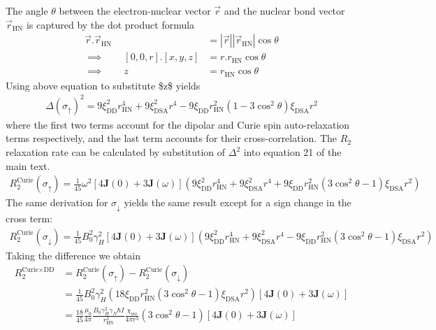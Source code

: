 \documentclass[a4paper,10pt,english,openany,oneside]{sphinxmanual}
\begin{document}
The angle \(\theta\) between the electron-nuclear vector \(\vec r\) and the nuclear bond vector \(\vec r_\text{HN}\) is captured by the dot product formula
\begin{equation*}
\begin{split}\vec r.\vec r_\text{HN} &= |\vec r||\vec r_\text{HN}| \cos{\theta}\\
\implies \qquad [0,0,r].[x,y,z] &= r.r_\text{HN} \cos{\theta}\\
\implies \qquad  z &= r_\text{HN} \cos{\theta}\end{split}
\end{equation*}
Using above equation to substitute \$z\$ yields
\begin{equation*}
\begin{split}\Delta(\sigma_\uparrow)^2= 9\xi_\text{DD}^2r_\text{HN}^4 + 9\xi_\text{DSA}^2r^4 - 9\xi_\text{DD}r_\text{HN}^2(1-3\cos^2{\theta})\xi_\text{DSA}r^2\end{split}
\end{equation*}
where the first two terms account for the dipolar and Curie spin auto-relaxation terms respectively, and the last term accounts for their cross-correlation. The \(R_2\) relaxation rate can be calculated by substitution of \(\Delta^2\) into equation 21 of the main text.
\begin{equation*}
\begin{split}R_2^\text{Curie}(\sigma_\uparrow) = \frac{1}{45}\omega^2 \left[4\mathbf{J}(0) + 3\mathbf{J}(\omega)\right]
\left( 9\xi_\text{DD}^2r_\text{HN}^4 + 9\xi_\text{DSA}^2r^4 +
9\xi_\text{DD}r_\text{HN}^2(3\cos^2{\theta}-1)\xi_\text{DSA}r^2 \right)\end{split}
\end{equation*}
The same derivation for \(\sigma_\downarrow\) yields the same result except for a sign change in the cross term:
\begin{equation*}
\begin{split}R_2^\text{Curie}(\sigma_\downarrow) = \frac{1}{45}B_0^2\gamma_H^2 \left[4\mathbf{J}(0) + 3\mathbf{J}(\omega)\right]
\left( 9\xi_\text{DD}^2r_\text{HN}^4 + 9\xi_\text{DSA}^2r^4 -
9\xi_\text{DD}r_\text{HN}^2(3\cos^2{\theta}-1)\xi_\text{DSA}r^2 \right)\end{split}
\end{equation*}
Taking the difference we obtain
\begin{equation*}
\begin{split}R_2^\text{Curie$\times$DD} &= R_2^\text{Curie}(\sigma_\uparrow) - R_2^\text{Curie}(\sigma_\downarrow)\\
&= \frac{1}{45}B_0^2\gamma_H^2 \left(18\xi_\text{DD}r_\text{HN}^2(3\cos^2{\theta}-1)\xi_\text{DSA}r^2 \right)\left[4\mathbf{J}(0) + 3\mathbf{J}(\omega)\right]\\
&=\frac{18}{45} \frac{\mu_0}{4\pi} \frac{B_0\gamma_H^2\gamma_N\hbar I}{r_\text{HN}^3}\frac{\chi_\text{iso}}{4\pi r^3}(3\cos^2{\theta}-1)\left[4\mathbf{J}(0) + 3\mathbf{J}(\omega)\right]\end{split}
\end{equation*}
\end{document}
